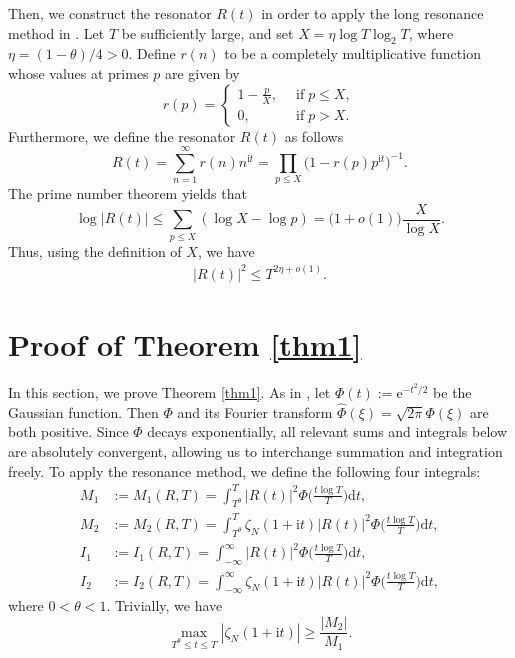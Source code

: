 \documentclass[12pt,reqno]{amsart}
\theoremstyle{definition}
\numberwithin{equation}{section}
\newcommand{\bg}{\big}
\newcommand{\Bg}{\Big}
\newcommand{\lo}{\log_2}
\newcommand{\inv}{^{-1}}
\newcommand{\ph}{\Phi}
\newcommand{\mme}{\mathrm{e}}
\newcommand{\mit}{\mathrm{i}t}
\newcommand{\mdt}{\mathrm{d}t}
\newcommand{\whp}{\widehat{\Phi}}
\begin{document}
Then, we construct the resonator \(R(t)\) in order to apply the long resonance method in \cite{aistleitner2019IMRN}. Let \(T\) be sufficiently large, and set \(X=\eta \log T \lo T\), where \(\eta = (1-\theta)/4 >0\). Define \(r(n)\) to be a completely multiplicative function whose values at primes \(p\) are given by
\begin{equation*}
    r(p) =
    \begin{cases}
        1-\frac{p}{X}, ~ &\operatorname{if} p \le X, \\
		0, ~ &\operatorname{if} p > X.
    \end{cases}
\end{equation*}
Furthermore, we define the resonator \(R(t)\) as follows
\[
R(t) = \sum_{n =1}^{\infty}r(n)n^{\mit} = \prod_{p \le X}\bg(1-r(p)p^{\mit} \bg)\inv.
\]
The prime number theorem yields that
\[
\log |R(t)| \le \sum_{p \le X}(\log X - \log p) = \bg(1+o(1)\bg)\frac{X}{\log X}.
\]
Thus, using the definition of \(X\), we have
\begin{align}
    \label{Rupper}
    |R(t)|^2 \le T^{2\eta+o(1)}.
\end{align}



\section{Proof of Theorem \ref{thm1}}
\label{sec-proof-thm1}

In this section, we prove Theorem \ref{thm1}. As in \cite{bondarenko2017Duke}, let \(\ph(t) := \mme^{-t^2/2}\) be the Gaussian function. Then \(\ph\) and its Fourier transform \(\whp(\xi)=\sqrt{2\pi}\Phi(\xi)\) are both positive. Since \(\ph\) decays exponentially, all relevant sums and integrals below are absolutely convergent, allowing us to interchange summation and integration freely. To apply the resonance method, we define the following four integrals:
\begin{align*}
    M_1 &:= M_1(R,T) = \int_{T^\theta}^T |R(t)|^2 \ph\Bg(\frac{t\log T}{T} \Bg) \mdt, \\
    M_2 &:= M_2(R,T) = \int_{T^\theta}^T \zeta_N(1+\mit)|R(t)|^2 \ph\Bg(\frac{t\log T}{T} \Bg) \mdt, \\
    I_1 &:= I_1(R,T) = \int_{-\infty}^{\infty} |R(t)|^2 \ph\Bg(\frac{t\log T}{T} \Bg) \mdt, \\
    I_2 &:= I_2(R,T) = \int_{-\infty}^{\infty} \zeta_N(1+\mit)|R(t)|^2 \ph\Bg(\frac{t\log T}{T} \Bg) \mdt,
\end{align*}
where \(0<\theta<1\). Trivially, we have
\[
\max_{T^\theta \le t \le T}|\zeta_N(1+\mit)| \ge \frac{|M_2|}{M_1}.
\]
\end{document}
